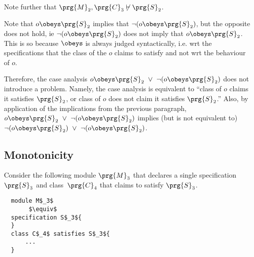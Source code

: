 Note further that $\prg{M}_2, \prg{C}_3 \not\vdash \prg{S}_2$.
%


Note that $o \obeys \prg{S}_2$ implies  that $\neg(o \obeys \prg{S}_2)$, but the opposite does not hold, ie
 $\neg(o \obeys \prg{S}_2)$ does not imply that $o \obeys \prg{S}_2$.
 This is so because $\obeys$ is always judged syntactically, i.e. wrt the
specifications that the class of the $o$ claims to satisfy and not wrt the behaviour of $o$.

Therefore, the case analysis $o \obeys \prg{S}_2 \ \vee\ \neg(o \obeys \prg{S}_2)$
does not introduce a problem.
Namely, the case analysis   is equivalent to ``class of $o$ claims it satisfies   $\prg{S}_2$,
or  class of $o$ does not claim it   satisfies   $\prg{S}_2$.''
Also, by application of the implications from the previous paragraph,
$o \obeys \prg{S}_2 \ \vee\ \neg(o \obeys \prg{S}_2)$ implies  (but is not equivalent to) $\neg(o \obeys \prg{S}_2 )\ \vee\ \neg(o \obeys \prg{S}_2)$.

\subsection{Monotonicity}

Consider the following module $\prg{M}_3$ that declares a single
specification~$\prg{S}_3$
and class~$\prg{C}_4$ that claims to satisfy $\prg{S}_3$.

 \begin{lstlisting}
  module M$_3$
       $\equiv$
  specification S$_3${
  }
  class C$_4$ satisfies S$_3${
      ...
  }
\end{lstlisting}


